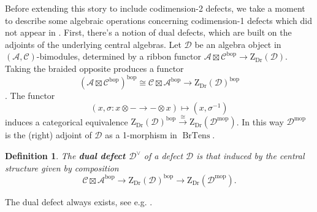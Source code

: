 \documentclass[a4paper]{article}
\numberwithin{equation}{section}
\newtheorem{definition}[counter]{Definition}
\newcommand{\1}{{\mathrm{1}\mkern-4mu{\mathchoice{}{}{\mskip-0.5mu}{\mskip-1mu}}\mathrm{l}}}
\newcommand{\A}{\mathcal{A}}
\newcommand{\C}{\mathcal{C}}
\newcommand{\D}{\mathcal{D}}
\newcommand{\bop}{\text{bop}}
\newcommand{\mop}{\text{mop}}
\newcommand{\Zdr}{\mathrm{Z}_{\text{Dr}}}
\DeclareMathOperator{\BrTens}{BrTens}
\begin{document}
Before extending this story to include codimension-2 defects, we take a moment to describe some algebraic operations concerning codimension-1 defects which did not appear in \cite{Brown_Jordan_2025}.
First, there's a notion of dual defects, which are built on the adjoints of the underlying central algebras.
    Let $\D$ be an algebra object in $(\A,\C)$-bimodules, determined by a ribbon functor $\A\boxtimes \C^{\bop} \to \Zdr(\D)$.
    Taking the braided opposite produces a functor 
    \begin{equation}
        (\A\boxtimes \C^{\bop})^{\bop} \cong \C \boxtimes \A^{\bop} \to \Zdr(\D)^{\bop}
    \end{equation}.
    The functor
    \begin{equation}
        (x,\sigma : x\otimes - \to - \otimes x) \mapsto (x,\sigma^{-1})
    \end{equation}
    induces a categorical equivalence $\Zdr(\D)^{\bop} \overset{\cong}{\longrightarrow} \Zdr(\D^{\mop})$.  
    In this way $\D^{\mop}$ is the (right) adjoint of $\D$ as a 1-morphism in $\BrTens$.
\begin{definition}\label{def:dual-defect}
  The \emph{\bf dual defect $\D^\vee$} of a defect $\D$ is that induced by the central structure given by composition
  \begin{equation}
    \C \boxtimes \A^{\bop} \to \Zdr(\D)^{\bop} \to \Zdr(\D^{\mop}).
  \end{equation}
\end{definition}
 The dual defect always exists, see e.g. \cite[Prop 4.14]{Gwilliam_Scheimbauer_2018}.
\end{document}
